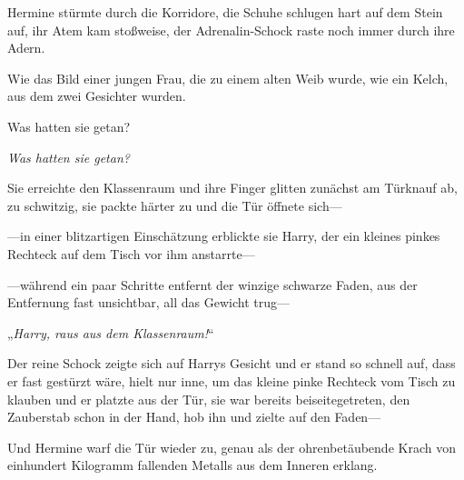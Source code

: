 \later

Hermine stürmte durch die Korridore, die Schuhe schlugen hart auf dem Stein auf, ihr Atem kam stoßweise, der Adrenalin-Schock raste noch immer durch ihre Adern.

Wie das Bild einer jungen Frau, die zu einem alten Weib wurde, wie ein Kelch, aus dem zwei Gesichter wurden.

Was hatten sie getan?

\emph{Was hatten sie getan?}

Sie erreichte den Klassenraum und ihre Finger glitten zunächst am Türknauf ab, zu schwitzig, sie packte härter zu und die Tür öffnete sich—

—in einer blitzartigen Einschätzung erblickte sie Harry, der ein kleines pinkes Rechteck auf dem Tisch vor ihm anstarrte—

—während ein paar Schritte entfernt der winzige schwarze Faden, aus der Entfernung fast unsichtbar, all das Gewicht trug—

„\emph{Harry, raus aus dem Klassenraum!}“

Der reine Schock zeigte sich auf Harrys Gesicht und er stand so schnell auf, dass er fast gestürzt wäre, hielt nur inne, um das kleine pinke Rechteck vom Tisch zu klauben und er platzte aus der Tür, sie war bereits beiseitegetreten, den Zauberstab schon in der Hand, hob ihn und zielte auf den Faden—


Und Hermine warf die Tür wieder zu, genau als der ohrenbetäubende Krach von einhundert Kilogramm fallenden Metalls aus dem Inneren erklang.

